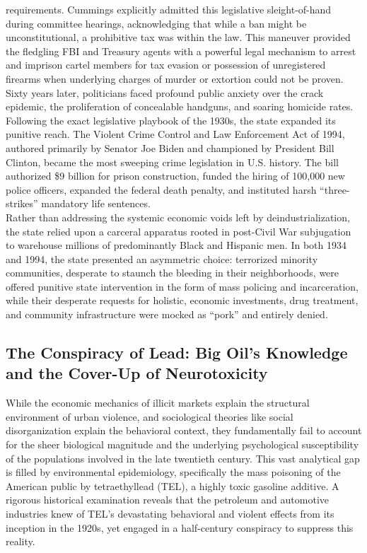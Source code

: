 \documentclass[
]{article}
\begin{document}
requirements. Cummings explicitly admitted this legislative
sleight-of-hand during committee hearings, acknowledging that while a
ban might be unconstitutional, a prohibitive tax was within the law.
This maneuver provided the fledgling FBI and Treasury agents with a
powerful legal mechanism to arrest and imprison cartel members for tax
evasion or possession of unregistered firearms when underlying charges
of murder or extortion could not be proven.\\
Sixty years later, politicians faced profound public anxiety over the
crack epidemic, the proliferation of concealable handguns, and soaring
homicide rates. Following the exact legislative playbook of the 1930s,
the state expanded its punitive reach. The Violent Crime Control and Law
Enforcement Act of 1994, authored primarily by Senator Joe Biden and
championed by President Bill Clinton, became the most sweeping crime
legislation in U.S. history. The bill authorized \$9 billion for prison
construction, funded the hiring of 100,000 new police officers, expanded
the federal death penalty, and instituted harsh ``three-strikes''
mandatory life sentences.\\
Rather than addressing the systemic economic voids left by
deindustrialization, the state relied upon a carceral apparatus rooted
in post-Civil War subjugation to warehouse millions of predominantly
Black and Hispanic men. In both 1934 and 1994, the state presented an
asymmetric choice: terrorized minority communities, desperate to staunch
the bleeding in their neighborhoods, were offered punitive state
intervention in the form of mass policing and incarceration, while their
desperate requests for holistic, economic investments, drug treatment,
and community infrastructure were mocked as ``pork'' and entirely
denied.

\subsection{\texorpdfstring{\textbf{The Conspiracy of Lead: Big Oil's
Knowledge and the Cover-Up of
Neurotoxicity}}{The Conspiracy of Lead: Big Oil's Knowledge and the Cover-Up of Neurotoxicity}}\label{the-conspiracy-of-lead-big-oils-knowledge-and-the-cover-up-of-neurotoxicity}

While the economic mechanics of illicit markets explain the structural
environment of urban violence, and sociological theories like social
disorganization explain the behavioral context, they fundamentally fail
to account for the sheer biological magnitude and the underlying
psychological susceptibility of the populations involved in the late
twentieth century. This vast analytical gap is filled by environmental
epidemiology, specifically the mass poisoning of the American public by
tetraethyllead (TEL), a highly toxic gasoline additive. A rigorous
historical examination reveals that the petroleum and automotive
industries knew of TEL's devastating behavioral and violent effects from
its inception in the 1920s, yet engaged in a half-century conspiracy to
suppress this reality.
\end{document}
